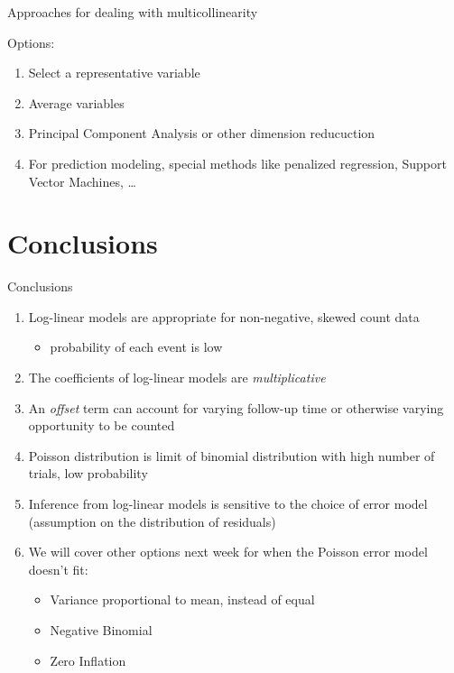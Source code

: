 \documentclass[
  ignorenonframetext,
]{beamer}
\providecommand{\tightlist}{%
  \setlength{\itemsep}{0pt}\setlength{\parskip}{0pt}}
\begin{document}
\begin{frame}{Approaches for dealing with multicollinearity}
\protect\hypertarget{approaches-for-dealing-with-multicollinearity}{}

Options:

\begin{enumerate}
\tightlist
\item
  Select a representative variable
\item
  Average variables
\item
  Principal Component Analysis or other dimension reducuction
\item
  For prediction modeling, special methods like penalized regression,
  Support Vector Machines, \ldots{}
\end{enumerate}

\end{frame}

\hypertarget{conclusions}{%
\section{Conclusions}\label{conclusions}}

\begin{frame}{Conclusions}
\protect\hypertarget{conclusions-1}{}

\begin{enumerate}
\tightlist
\item
  Log-linear models are appropriate for non-negative, skewed count data

  \begin{itemize}
  \tightlist
  \item
    probability of each event is low
  \end{itemize}
\item
  The coefficients of log-linear models are \emph{multiplicative}
\item
  An \emph{offset} term can account for varying follow-up time or
  otherwise varying opportunity to be counted
\item
  Poisson distribution is limit of binomial distribution with high
  number of trials, low probability
\item
  Inference from log-linear models is sensitive to the choice of error
  model (assumption on the distribution of residuals)
\item
  We will cover other options next week for when the Poisson error model
  doesn't fit:

  \begin{itemize}
  \tightlist
  \item
    Variance proportional to mean, instead of equal
  \item
    Negative Binomial
  \item
    Zero Inflation
  \end{itemize}
\end{enumerate}

\end{frame}
\end{document}
